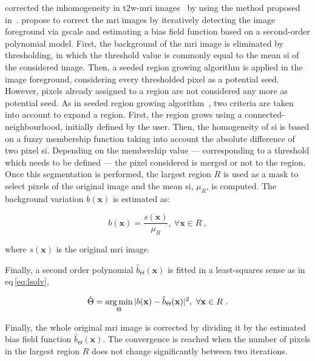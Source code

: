 \citeauthor{Lv2009} corrected the inhomogeneity in \ac{t2w}-\ac{mri} images~\cite{Lv2009} by using the method proposed in~\cite{Madabhushi2006}.
\citeauthor{Madabhushi2006} propose to correct the \ac{mri} images by iteratively detecting the image foreground via \ac{gscale} and estimating a bias field function based on a second-order polynomial model.
First, the background of the \ac{mri} image is eliminated by thresholding, in which the threshold value is commonly equal to the mean \ac{si} of the considered image.
Then, a seeded region growing algorithm is applied in the image foreground, considering every thresholded pixel as a potential seed.
However, pixels already assigned to a region are not considered any more as potential seed.
As in seeded region growing algorithm~\cite{Shapiro2001}, two criteria are taken into account to expand a region.
First, the region grows using a connected-neighbourhood, initially defined by the user.
Then, the homogeneity of \ac{si} is based on a fuzzy membership function taking into account the absolute difference of two pixel \ac{si}.
Depending on the membership value --- corresponding to a threshold which needs to be defined --- the pixel considered is merged or not to the region.
Once this segmentation is performed, the largest region $R$ is used as a mask to select pixels of the original image and the mean \ac{si}, $\mu_{R}$, is computed. 
The background variation $b(\mathbf{x})$ is estimated as:

\begin{equation}
	b(\mathbf{x}) = \frac{s(\mathbf{x})}{\mu_{R}}, \ \forall \mathbf{x} \in R \ ,
	\label{eq:backest}
\end{equation}

\noindent where $s(\mathbf{x})$ is the original \ac{mri} image.

Finally, a second order polynomial $\hat{b}_{\Theta}(\mathbf{x})$ is fitted in a least-squares sense as in \acs{eq}\,\eqref{eq:lsolv},

\begin{equation}
	\hat{\Theta} = \operatorname*{arg\,min}_{\Theta} | b(\mathbf{x}) - \hat{b}_{\Theta}(\mathbf{x}) |^{2}, \ \forall \mathbf{x} \in R \ .
	\label{eq:lsolv}
\end{equation}

Finally, the whole original \ac{mri} image is corrected by dividing it by the estimated bias field function $\hat{b}_{\Theta}(\mathbf{x})$.
The convergence is reached when the number of pixels in the largest region $R$ does not change significantly between two iterations.

